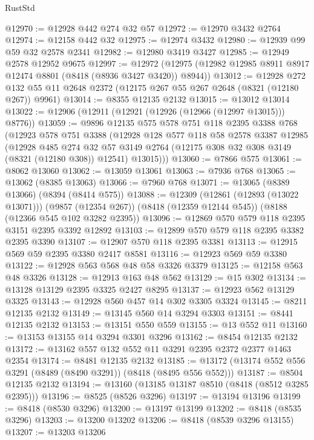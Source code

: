 \begin{lexlean}{RustStd}
\begin{coremodule}
@12970 := @12928 @442 @274 @32 @57
@12972 := @12970 @3432 @2764
@12974 := @12158 @442 @32
@12975 := @12974 @3432
@12980 := @12939 @99 @59 @32 @2578 @2341
@12982 := @12980 @3419 @3427
@12985 := @12949 @2578 @12952 @9675
@12997 := @12972 (@12975 (@12982 @12985 @8911 @8917 @12474 @8801 (@8418 (@8936 @3427 @3420)) @8944))
@13012 := @12928
    @272
    @132
    @55
    @11
    @2648
    @2372
    (@12175 @267 @55 @267 @2648 (@8321 (@12180 @267)) @9961)
@13014 := @8355 @12135 @2132
@13015 := @13012 @13014
@13022 := @12906 (@12911 (@12921 (@12926 (@12966 (@12997 @13015))) @8776))
@13059 := @9896
    @12135
    @575
    @578
    @751
    @118
    @2395
    @3388
    @768
    (@12923
      @578
      @751
      @3388
      (@12928
        @128
        @577
        @118
        @58
        @2578
        @3387
        @12985
        (@12928
          @485
          @274
          @32
          @57
          @3149
          @2764
          (@12175 @308 @32 @308 @3149 (@8321 (@12180 @308)) @12541)
          @13015)))
@13060 := @7866 @575
@13061 := @8062 @13060
@13062 := @13059 @13061
@13063 := @7936 @768
@13065 := @13062 (@8385 @13063)
@13066 := @7960 @768
@13071 := @13065 (@8389 @13066) (@8394 (@8414 @575))
@13088 := @12309
    (@12861 (@12893 (@13022 @13071)))
    (@9857 (@12354 @267))
    (@8418 (@12359 @12144 @545))
    (@8188 (@12366 @545 @102 @3282 @2395))
@13096 := @12869 @570 @579 @118 @2395 @3151 @2395 @3392 @12892
@13103 := @12899 @570 @579 @118 @2395 @3382 @2395 @3390
@13107 := @12907 @570 @118 @2395 @3381
@13113 := @12915 @569 @59 @2395 @3380 @2417 @8581
@13116 := @12923 @569 @59 @3380
@13122 := @12928 @563 @568 @48 @58 @3326 @3379
@13125 := @12158 @563 @48 @3326
@13128 := @12913 @163 @48 @562
@13129 := @15 @302
@13134 := @13128 @13129 @2395 @3325 @2427 @8295
@13137 := @12923 @562 @13129 @3325
@13143 := @12928 @560 @457 @14 @302 @3305 @3324
@13145 := @8211 @12135 @2132
@13149 := @13145 @560 @14 @3294 @3303
@13151 := @8441 @12135 @2132
@13153 := @13151 @550 @559
@13155 := @13 @552 @11
@13160 := @13153 @13155 @14 @3294 @3301 @3296
@13162 := @8454 @12135 @2132
@13172 := @13162 @557 @132 @552 @11 @3291 @2395 @2372 @2377 @1463 @2354
@13174 := @8481 @12135 @2132
@13185 := @13172 (@13174 @552 @556 @3291 (@8489 (@8490 @3291)) (@8418 (@8495 @556 @552)))
@13187 := @8504 @12135 @2132
@13194 := @13160 (@13185 @13187 @8510 (@8418 (@8512 @3285 @2395)))
@13196 := @8525 (@8526 @3296)
@13197 := @13194 @13196
@13199 := @8418 (@8530 @3296)
@13200 := @13197 @13199
@13202 := @8418 (@8535 @3296)
@13203 := @13200 @13202
@13206 := @8418 (@8539 @3296 @13155)
@13207 := @13203 @13206

\end{coremodule}
\end{lexlean}
